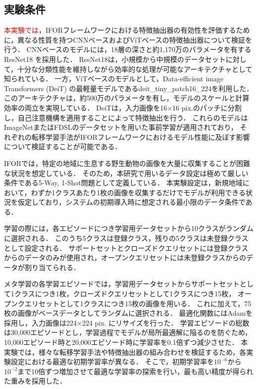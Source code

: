 \documentclass[a4paper,11pt,nomag]{jsreport}
\begin{document}
\subsection{実験条件}

\textcolor{red}{本実験では}，IFORフレームワークにおける特徴抽出器の有効性を評価するために，異なる性質を持つCNNベースおよびViTベースの特徴抽出器について検証を行う．
CNNベースのモデルには，18層の深さと約1,170万のパラメータを有するResNet18 \cite{resnet}を採用した．
ResNet18は，小規模から中規模のデータセットに対して，十分な分類性能を維持しながら効率的な処理が可能なアーキテクチャとして知られている．
一方，ViTベースのモデルとして，Data-efficient image Transformers (DeiT) \cite{deit} の最軽量モデルであるdeit\_tiny\_patch16\_224を利用した．
このアーキテクチャは，約500万のパラメータを有し，モデルのスケールと計算効率の両立を実現している．
DeiTは，入力画像を16$\times$16 pix.のパッチに分割し，自己注意機構を適用することによって特徴抽出を行う．
これらのモデルはImageNetまたはFDSLのデータセットを用いた事前学習が適用されており，
それぞれの転移学習手法がIFORフレームワークにおけるモデル性能に及ぼす影響について検証することが可能である．

IFORでは，特定の地域に生息する野生動物の画像を大量に収集することが困難な状況を想定している．
そのため，本研究で用いるデータ設定は極めて厳しい条件である5-Way, 1-Shot問題として定義している．
本実験設定は，新規地域において，わずか1クラスあたり1枚の画像を収集するだけでモデルが利用できる状況を仮定しており，システムの初期導入時に想定される最小限のデータ条件である．

学習の際には，各エピソードにつき学習用データセットから10クラスがランダムに選択される．
このうち5クラスは登録クラス，残りの5クラスは未登録クラスとして設定される．
サポートセットとクローズドクエリセットには登録クラスからのデータのみが使用され，オープンクエリセットには未登録クラスからのデータが割り当てられる．

メタ学習の各学習エピソードでは，学習用データセットからサポートセットとして1クラスにつき1枚，クローズドクエリセットとして1クラスにつき15枚，
オープンクエリセットとして1クラスにつき15枚の画像を用いる．
これに加えて，75枚の画像がベースデータとしてランダムに選択される．
最適化関数にはAdamを採用し，入力画像は224$\times$224 pix. にリサイズを行った．
学習エピソードの総数は30,000エピソードとし，学習過程でモデルが局所最適解に陥るのを防ぐため，10,000エピソード時と20,000エピソード時に学習率を0.1倍ずつ減少させた．
本実験では，様々な転移学習手法や特徴抽出器の組み合わせを検証するため，各実験設定における最適な初期学習率が異なる．
そこで，初期学習率を$10^{-6}$から$10^{-2}$まで10倍ずつ増加させて最適な学習率の探索を行い，最も高い精度が得られた重みを採用した．
\end{document}
